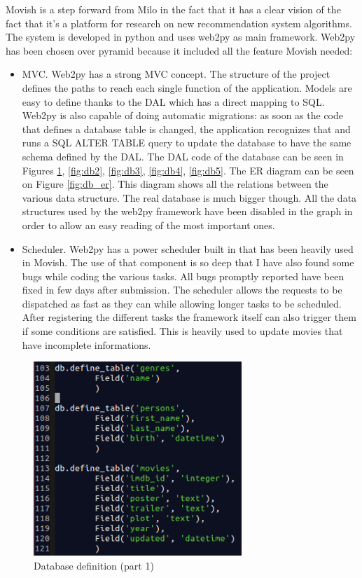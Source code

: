 Movish is a step forward from Milo in the fact that it has a clear vision of the fact that it's a platform for research on new recommendation system algorithms. The system is developed in python and uses web2py \cite{web2py} as main framework. Web2py has been chosen over pyramid because it included all the feature Movish needed:
\begin{itemize}
\item \ac{MVC}. Web2py has a strong \ac{MVC} concept. The structure of the project defines the paths to reach each single function of the application. Models are easy to define thanks to the \ac{DAL} which has a direct mapping to \ac{SQL}. Web2py is also capable of doing automatic migrations: as soon as the code that defines a database table is changed, the application recognizes that and runs a \ac{SQL} ALTER TABLE query to update the database to have the same schema defined by the \ac{DAL}.
The \ac{DAL} code of the database can be seen in Figures \ref{fig:db1}, \ref{fig:db2}, \ref{fig:db3}, \ref{fig:db4}, \ref{fig:db5}. 
The \ac{ER} diagram can be seen on Figure \ref{fig:db_er}. This diagram shows all the relations between the various data structure. The real database is much bigger though. All the data structures used by the web2py framework have been disabled in the graph in order to allow an easy reading of the most important ones.
\item Scheduler. Web2py has a power scheduler built in that has been heavily used in Movish. The use of that component is so deep that I have also found some bugs while coding the various tasks. All bugs promptly reported have been fixed in few days after submission. The scheduler allows the requests to be dispatched as fast as they can while allowing longer tasks to be scheduled. After registering the different tasks the framework itself can also trigger them if some conditions are satisfied. This is heavily used to update movies that have incomplete informations.
\end{itemize}

\begin{figure}
  \centering
  \includegraphics[width=0.7\textwidth]{figures/db1.png}
  \caption{Database definition (part 1)}
  \label{fig:db1}
\end{figure}

